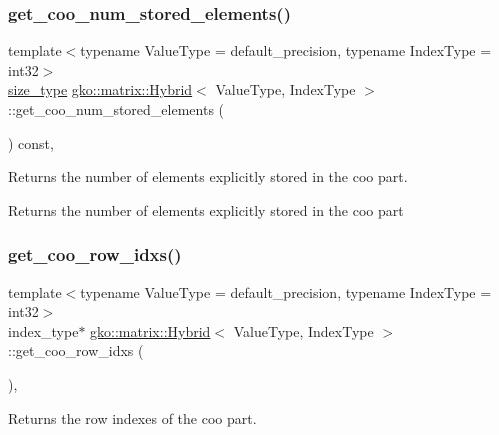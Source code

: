 \subsubsection{\texorpdfstring{get\+\_\+coo\+\_\+num\+\_\+stored\+\_\+elements()}{get\_coo\_num\_stored\_elements()}}
{\footnotesize\ttfamily template$<$typename Value\+Type = default\+\_\+precision, typename Index\+Type = int32$>$ \\
\hyperlink{namespacegko_a6e5c95df0ae4e47aab2f604a22d98ee7}{size\+\_\+type} \hyperlink{classgko_1_1matrix_1_1Hybrid}{gko\+::matrix\+::\+Hybrid}$<$ Value\+Type, Index\+Type $>$\+::get\+\_\+coo\+\_\+num\+\_\+stored\+\_\+elements (\begin{DoxyParamCaption}{ }\end{DoxyParamCaption}) const\hspace{0.3cm}{\ttfamily [inline]}, {\ttfamily [noexcept]}}



Returns the number of elements explicitly stored in the coo part. 

\begin{DoxyReturn}{Returns}
the number of elements explicitly stored in the coo part 
\end{DoxyReturn}
\mbox{\label{classgko_1_1matrix_1_1Hybrid_aa64e1442587df4be9bc55f38d91be26d}} 
\subsubsection{\texorpdfstring{get\+\_\+coo\+\_\+row\+\_\+idxs()}{get\_coo\_row\_idxs()}}
{\footnotesize\ttfamily template$<$typename Value\+Type = default\+\_\+precision, typename Index\+Type = int32$>$ \\
index\+\_\+type$\ast$ \hyperlink{classgko_1_1matrix_1_1Hybrid}{gko\+::matrix\+::\+Hybrid}$<$ Value\+Type, Index\+Type $>$\+::get\+\_\+coo\+\_\+row\+\_\+idxs (\begin{DoxyParamCaption}{ }\end{DoxyParamCaption})\hspace{0.3cm}{\ttfamily [inline]}, {\ttfamily [noexcept]}}



Returns the row indexes of the coo part. 

